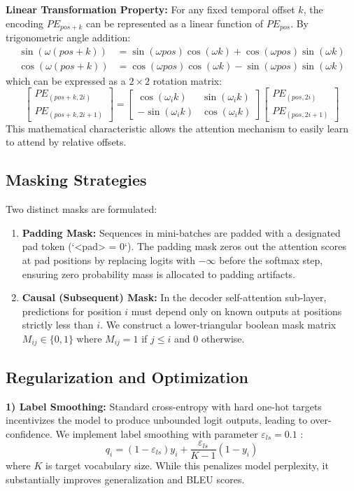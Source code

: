 \documentclass[conference]{IEEEtran}
\begin{document}
\textbf{Linear Transformation Property:}
For any fixed temporal offset $k$, the encoding $PE_{pos+k}$ can be represented as a linear function of $PE_{pos}$. By trigonometric angle addition:
\begin{align}
\sin(\omega (pos + k)) &= \sin(\omega pos)\cos(\omega k) + \cos(\omega pos)\sin(\omega k) \\
\cos(\omega (pos + k)) &= \cos(\omega pos)\cos(\omega k) - \sin(\omega pos)\sin(\omega k)
\end{align}
which can be expressed as a $2 \times 2$ rotation matrix:
\begin{equation}
\begin{bmatrix} PE_{(pos+k, 2i)} \\ PE_{(pos+k, 2i+1)} \end{bmatrix} = \begin{bmatrix} \cos(\omega_i k) & \sin(\omega_i k) \\ -\sin(\omega_i k) & \cos(\omega_i k) \end{bmatrix} \begin{bmatrix} PE_{(pos, 2i)} \\ PE_{(pos, 2i+1)} \end{bmatrix}
\end{equation}
This mathematical characteristic allows the attention mechanism to easily learn to attend by relative offsets.

\subsection{Masking Strategies}
Two distinct masks are formulated:
\begin{enumerate}
    \item \textbf{Padding Mask:} Sequences in mini-batches are padded with a designated pad token (`<pad> = 0`). The padding mask zeros out the attention scores at pad positions by replacing logits with $-\infty$ before the softmax step, ensuring zero probability mass is allocated to padding artifacts.
    \item \textbf{Causal (Subsequent) Mask:} In the decoder self-attention sub-layer, predictions for position $i$ must depend only on known outputs at positions strictly less than $i$. We construct a lower-triangular boolean mask matrix $M_{ij} \in \{0, 1\}$ where $M_{ij} = 1$ if $j \le i$ and $0$ otherwise.
\end{enumerate}

\subsection{Regularization and Optimization}
\textbf{1) Label Smoothing:} Standard cross-entropy with hard one-hot targets incentivizes the model to produce unbounded logit outputs, leading to over-confidence. We implement label smoothing with parameter $\varepsilon_{ls} = 0.1$ \cite{szegedy2016rethinking}:
\begin{equation}
q_i = (1 - \varepsilon_{ls}) y_i + \frac{\varepsilon_{ls}}{K - 1} (1 - y_i)
\end{equation}
where $K$ is target vocabulary size. While this penalizes model perplexity, it substantially improves generalization and BLEU scores.
\end{document}

